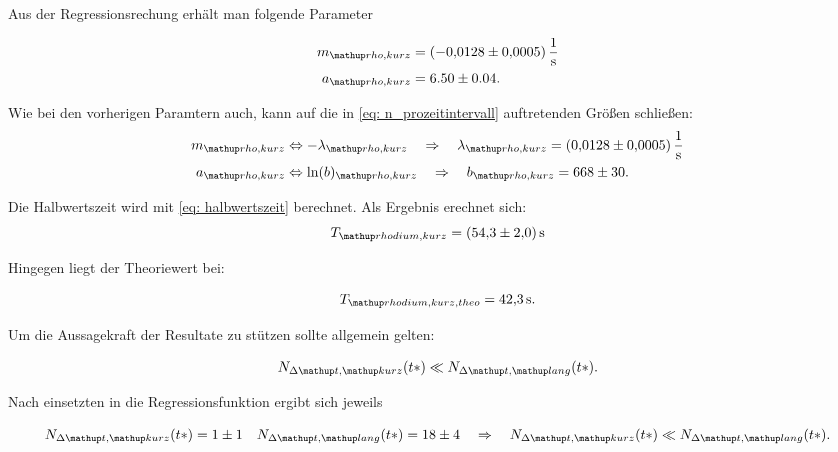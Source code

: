 Aus der Regressionsrechung erhält man folgende Parameter

\begin{align}
  \label{eq:parameter_rhodium_kurz}
  \begin{aligned}
    m\ua{rho,kurz}&=\SI{-0.0128\pm0.0005}{\per\second}\\
    a\ua{rho,kurz}&=6.50\pm0.04.
  \end{aligned}
\end{align}

Wie bei den vorherigen Paramtern auch, kann auf die in \eqref{eq: n_prozeitintervall} auftretenden Größen
schließen:
\begin{align}
  \label{eq:parameter_rhodium_kurz_lambda}
  \begin{aligned}
    m\ua{rho,kurz}&\Leftrightarrow -\lambda\ua{rho,kurz} \quad \Rightarrow \quad \lambda\ua{rho,kurz}=\SI{0.0128\pm0.0005}{\per\second}\\
    a\ua{rho,kurz}&\Leftrightarrow \ln(b)\ua{rho,kurz} \quad \Rightarrow \quad b\ua{rho,kurz} =668\pm 30.
  \end{aligned}
\end{align}

Die Halbwertszeit wird mit \eqref{eq: halbwertszeit} berechnet.
Als Ergebnis erechnet sich:
\begin{equation}
  \label{eq:halbwertzeit_rhodium_kurz}
  T\ua{rhodium, kurz}=\SI{54.3\pm2.0 }{\second}
\end{equation}

Hingegen liegt der Theoriewert\cite{rhodium_kurz_halb} bei:

\begin{equation}
  \label{eq:halbwertzeit_rhodium_kurz_theo}
  T\ua{rhodium, kurz, theo}=\SI{42.3}{\second}.
\end{equation}



Um die Aussagekraft der Resultate zu stützen sollte allgemein gelten:

\begin{equation*}
  N_{\Delta \map{t}, \map{kurz}}(t*)\ll N_{\Delta \map{t}, \map{lang}}(t*).
\end{equation*}

Nach einsetzten in die Regressionsfunktion ergibt sich jeweils

\begin{equation*}
    N_{\Delta \map{t}, \map{kurz}}(t*)= 1\pm1 \quad  N_{\Delta \map{t}, \map{lang}}(t*)= 18\pm 4 \quad \Rightarrow \quad N_{\Delta \map{t}, \map{kurz}}(t*)\ll N_{\Delta \map{t}, \map{lang}}(t*).
\end{equation*}

